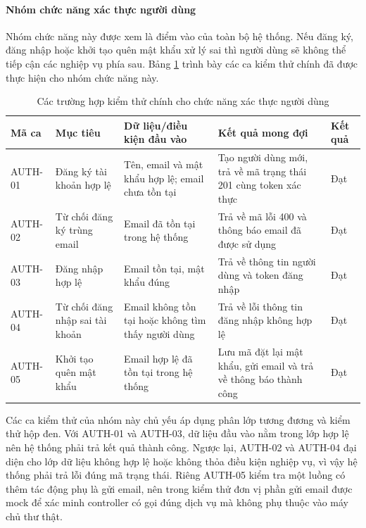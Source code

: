\documentclass[../DoAn.tex]{subfiles}
\begin{document}
\paragraph{Nhóm chức năng xác thực người dùng}\mbox{}

Nhóm chức năng này được xem là điểm vào của toàn bộ hệ thống. Nếu đăng ký, đăng nhập hoặc khởi tạo quên mật khẩu xử lý sai thì người dùng sẽ không thể tiếp cận các nghiệp vụ phía sau. Bảng \ref{tab:test-auth} trình bày các ca kiểm thử chính đã được thực hiện cho nhóm chức năng này.

\begin{table}[H]
\centering
\footnotesize
\renewcommand{\arraystretch}{1.3}
\begin{tabular}{|p{1.8cm}|p{3.4cm}|p{3.9cm}|p{3.9cm}|p{1.7cm}|}
\hline
\textbf{Mã ca} & \textbf{Mục tiêu} & \textbf{Dữ liệu/điều kiện đầu vào} & \textbf{Kết quả mong đợi} & \textbf{Kết quả} \\ \hline
AUTH-01 & Đăng ký tài khoản hợp lệ & Tên, email và mật khẩu hợp lệ; email chưa tồn tại & Tạo người dùng mới, trả về mã trạng thái 201 cùng token xác thực & Đạt \\ \hline
AUTH-02 & Từ chối đăng ký trùng email & Email đã tồn tại trong hệ thống & Trả về mã lỗi 400 và thông báo email đã được sử dụng & Đạt \\ \hline
AUTH-03 & Đăng nhập hợp lệ & Email tồn tại, mật khẩu đúng & Trả về thông tin người dùng và token đăng nhập & Đạt \\ \hline
AUTH-04 & Từ chối đăng nhập sai tài khoản & Email không tồn tại hoặc không tìm thấy người dùng & Trả về lỗi thông tin đăng nhập không hợp lệ & Đạt \\ \hline
AUTH-05 & Khởi tạo quên mật khẩu & Email hợp lệ đã tồn tại trong hệ thống & Lưu mã đặt lại mật khẩu, gửi email và trả về thông báo thành công & Đạt \\ \hline
\end{tabular}
\caption{Các trường hợp kiểm thử chính cho chức năng xác thực người dùng}
\label{tab:test-auth}
\end{table}

Các ca kiểm thử của nhóm này chủ yếu áp dụng phân lớp tương đương và kiểm thử hộp đen. Với AUTH-01 và AUTH-03, dữ liệu đầu vào nằm trong lớp hợp lệ nên hệ thống phải trả kết quả thành công. Ngược lại, AUTH-02 và AUTH-04 đại diện cho lớp dữ liệu không hợp lệ hoặc không thỏa điều kiện nghiệp vụ, vì vậy hệ thống phải trả lỗi đúng mã trạng thái. Riêng AUTH-05 kiểm tra một luồng có thêm tác động phụ là gửi email, nên trong kiểm thử đơn vị phần gửi email được mock để xác minh controller có gọi đúng dịch vụ mà không phụ thuộc vào máy chủ thư thật.
\end{document}
